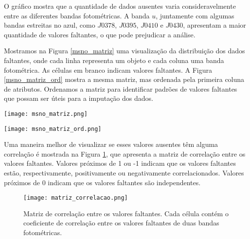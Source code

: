 O gráfico mostra que a quantidade de dados ausentes varia consideravelmente entre as diferentes bandas fotométricas. A banda $u$, juntamente com algumas bandas estreitas no azul, como $J0378$, $J0395$, $J0410$ e $J0430$, apresentam a maior quantidade de valores faltantes, o que pode prejudicar a análise.

Mostramos na Figura \ref{msno_matriz} uma visualização da distribuição dos dados faltantes, onde cada linha representa um objeto e cada coluna uma banda fotométrica. As células em branco indicam valores faltantes. A Figura \ref{msno_matriz_ord} mostra a mesma matriz, mas ordenada pela primeira coluna de atributos. Ordenamos a matriz para identificar padrões de valores faltantes que possam ser úteis para a imputação dos dados.

\begin{center}
    \begin{minipage}{0.45\textwidth}
        \centering
        \texttt{[image: msno\_matriz.png]}
        \captionsetup{}
        \label{msno_matriz}
    \end{minipage}
    \hfill
    \begin{minipage}{0.45\textwidth}
        \centering
        \texttt{[image: msno\_matriz\_ord.png]}
        \captionsetup{}
        \label{msno_matriz_ord}
    \end{minipage}
\end{center}

Uma maneira melhor de visualizar se esses valores ausentes têm alguma correlação é mostrada na Figura \ref{matriz_correlacao}, que apresenta a matriz de correlação entre os valores faltantes. Valores próximos de 1 ou -1 indicam que os valores faltantes estão, respectivamente, positivamente ou negativamente correlacionados. Valores próximos de 0 indicam que os valores faltantes são independentes.

\begin{figure}[!ht]
    \begin{center}
    \texttt{[image: matriz\_correlacao.png]}
    \caption[]{Matriz de correlação entre os valores faltantes. Cada célula contém o coeficiente de correlação entre os valores faltantes de duas bandas fotométricas.}
    \label{matriz_correlacao}
    \end{center}
\end{figure}

